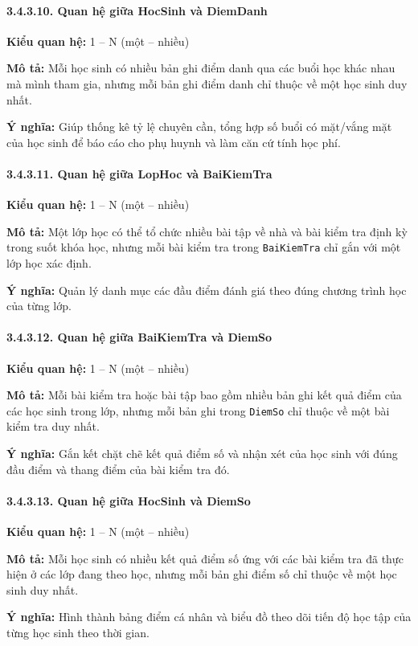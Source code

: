 \documentclass[12pt,a4paper]{article}
\begin{document}
\paragraph{3.4.3.10. Quan hệ giữa HocSinh và DiemDanh}\mbox{}\par
\textbf{Kiểu quan hệ:} 1 -- N (một -- nhiều)\par
\textbf{Mô tả:} Mỗi học sinh có nhiều bản ghi điểm danh qua các buổi học khác nhau mà mình tham gia, nhưng mỗi bản ghi điểm danh chỉ thuộc về một học sinh duy nhất.\par
\textbf{Ý nghĩa:} Giúp thống kê tỷ lệ chuyên cần, tổng hợp số buổi có mặt/vắng mặt của học sinh để báo cáo cho phụ huynh và làm căn cứ tính học phí.

\paragraph{3.4.3.11. Quan hệ giữa LopHoc và BaiKiemTra}\mbox{}\par
\textbf{Kiểu quan hệ:} 1 -- N (một -- nhiều)\par
\textbf{Mô tả:} Một lớp học có thể tổ chức nhiều bài tập về nhà và bài kiểm tra định kỳ trong suốt khóa học, nhưng mỗi bài kiểm tra trong \texttt{BaiKiemTra} chỉ gắn với một lớp học xác định.\par
\textbf{Ý nghĩa:} Quản lý danh mục các đầu điểm đánh giá theo đúng chương trình học của từng lớp.

\paragraph{3.4.3.12. Quan hệ giữa BaiKiemTra và DiemSo}\mbox{}\par
\textbf{Kiểu quan hệ:} 1 -- N (một -- nhiều)\par
\textbf{Mô tả:} Mỗi bài kiểm tra hoặc bài tập bao gồm nhiều bản ghi kết quả điểm của các học sinh trong lớp, nhưng mỗi bản ghi trong \texttt{DiemSo} chỉ thuộc về một bài kiểm tra duy nhất.\par
\textbf{Ý nghĩa:} Gắn kết chặt chẽ kết quả điểm số và nhận xét của học sinh với đúng đầu điểm và thang điểm của bài kiểm tra đó.

\paragraph{3.4.3.13. Quan hệ giữa HocSinh và DiemSo}\mbox{}\par
\textbf{Kiểu quan hệ:} 1 -- N (một -- nhiều)\par
\textbf{Mô tả:} Mỗi học sinh có nhiều kết quả điểm số ứng với các bài kiểm tra đã thực hiện ở các lớp đang theo học, nhưng mỗi bản ghi điểm số chỉ thuộc về một học sinh duy nhất.\par
\textbf{Ý nghĩa:} Hình thành bảng điểm cá nhân và biểu đồ theo dõi tiến độ học tập của từng học sinh theo thời gian.
\end{document}
